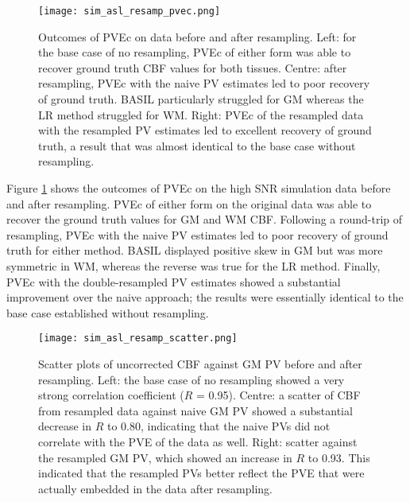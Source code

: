 \begin{figure}[H]
\centering
\texttt{[image: sim\_asl\_resamp\_pvec.png]}
\caption{Outcomes of PVEc on data before and after resampling. Left: for the base case of no resampling, PVEc of either form was able to recover ground truth CBF values for both tissues. Centre: after resampling, PVEc with the naive PV estimates led to poor recovery of ground truth. BASIL particularly struggled for GM whereas the LR method struggled for WM. Right: PVEc of the resampled data with the resampled PV estimates led to excellent recovery of ground truth, a result that was almost identical to the base case without resampling.}
\label{sim_asl_resamp_pvec}
\end{figure}

Figure \ref{sim_asl_resamp_pvec} shows the outcomes of PVEc on the high SNR simulation data before and after resampling. PVEc of either form on the original data was able to recover the ground truth values for GM and WM CBF. Following a round-trip of resampling, PVEc with the naive PV estimates led to poor recovery of ground truth for either method. BASIL displayed positive skew in GM but was more symmetric in WM, whereas the reverse was true for the LR method. Finally, PVEc with the double-resampled PV estimates showed a substantial improvement over the naive approach; the results were essentially identical to the base case established without resampling. 

\begin{figure}[H]
\centering
\texttt{[image: sim\_asl\_resamp\_scatter.png]}
\caption{Scatter plots of uncorrected CBF against GM PV before and after resampling. Left: the base case of no resampling showed a very strong correlation coefficient ($R$ = 0.95). Centre: a scatter of CBF from resampled data against naive GM PV showed a substantial decrease in $R$ to 0.80, indicating that the naive PVs did not correlate with the PVE of the data as well. Right: scatter against the resampled GM PV, which showed an increase in $R$ to 0.93. This indicated that the resampled PVs better reflect the PVE that were actually embedded in the data after resampling.}
\label{sim_asl_resamp_scatter}
\end{figure}

